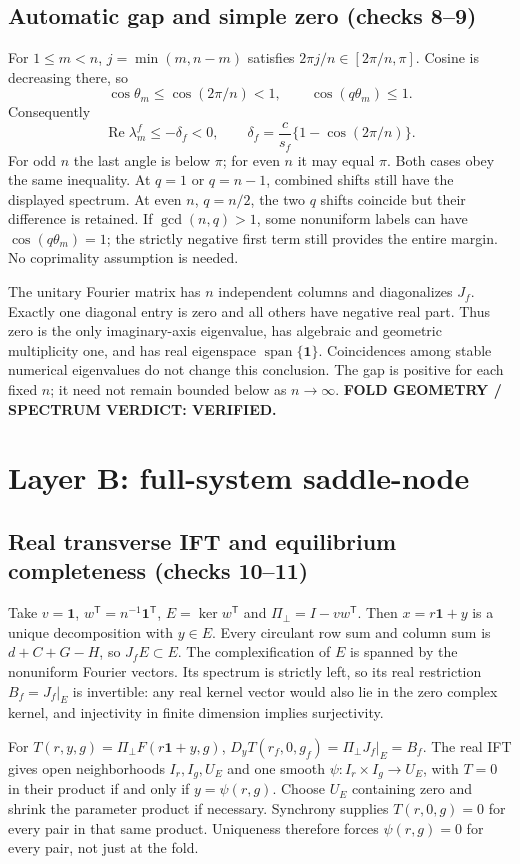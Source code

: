 \documentclass[11pt]{article}
\newcommand{\one}{\mathbf1}
\newcommand{\Ree}{\operatorname{Re}}
\begin{document}
\subsection{Automatic gap and simple zero (checks 8--9)}
For $1\le m<n$, $j=\min(m,n-m)$ satisfies
$2\pi j/n\in[2\pi/n,\pi]$. Cosine is decreasing there, so
\[
 \cos\theta_m\le\cos(2\pi/n)<1,\qquad \cos(q\theta_m)\le1.
\]
Consequently
\[
 \Ree\lambda_m^f\le-\delta_f<0,\qquad
 \delta_f=\frac c{s_f}\{1-\cos(2\pi/n)\}.
\]
For odd $n$ the last angle is below $\pi$; for even $n$ it may equal $\pi$.
Both cases obey the same inequality. At $q=1$ or $q=n-1$, combined shifts
still have the displayed spectrum. At even $n$, $q=n/2$, the two $q$ shifts
coincide but their difference is retained. If $\gcd(n,q)>1$, some nonuniform
labels can have $\cos(q\theta_m)=1$; the strictly negative first term still
provides the entire margin. No coprimality assumption is needed.

The unitary Fourier matrix has $n$ independent columns and diagonalizes $J_f$.
Exactly one diagonal entry is zero and all others have negative real part.
Thus zero is the only imaginary-axis eigenvalue, has algebraic and geometric
multiplicity one, and has real eigenspace $\operatorname{span}\{\one\}$.
Coincidences among stable numerical eigenvalues do not change this conclusion.
The gap is positive for each fixed $n$; it need not remain bounded below as
$n\to\infty$. \textbf{FOLD GEOMETRY / SPECTRUM VERDICT: VERIFIED.}

\section{Layer B: full-system saddle-node}
\label{sec:B}
\subsection{Real transverse IFT and equilibrium completeness (checks 10--11)}
Take $v=\one$, $w^{\mathsf T}=n^{-1}\one^{\mathsf T}$,
$E=\ker w^{\mathsf T}$ and $\Pi_\perp=I-vw^{\mathsf T}$. Then
$x=r\one+y$ is a unique decomposition with $y\in E$. Every circulant row
sum and column sum is $d+C+G-H$, so $J_f E\subset E$. The complexification
of $E$ is spanned by the nonuniform Fourier vectors. Its spectrum is strictly
left, so its real restriction $B_f=J_f|_E$ is invertible: any real kernel
vector would also lie in the zero complex kernel, and injectivity in finite
dimension implies surjectivity.

For $T(r,y,g)=\Pi_\perp F(r\one+y,g)$,
$D_yT(r_f,0,g_f)=\Pi_\perp J_f|_E=B_f$. The real IFT gives open
neighborhoods $I_r,I_g,U_E$ and one smooth $\psi:I_r\times I_g\to U_E$,
with $T=0$ in their product if and only if $y=\psi(r,g)$. Choose $U_E$
containing zero and shrink the parameter product if necessary. Synchrony
supplies $T(r,0,g)=0$ for every pair in that same product. Uniqueness therefore
forces $\psi(r,g)=0$ for every pair, not just at the fold.
\end{document}
